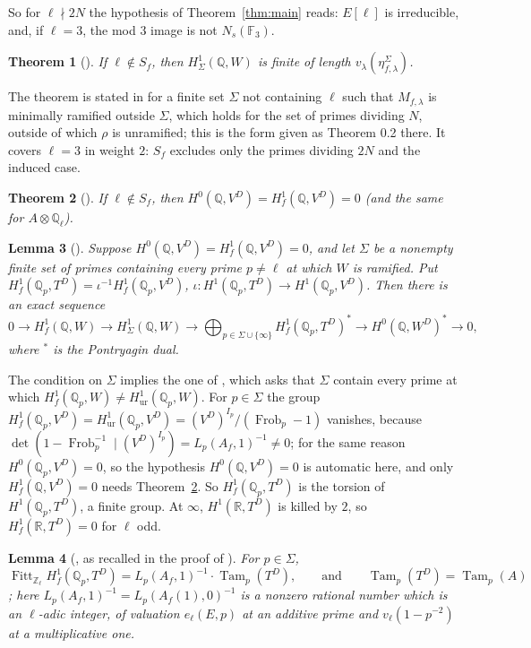 \documentclass[11pt]{amsart}
\newtheorem{theorem}{Theorem}[section]
\newtheorem{lemma}[theorem]{Lemma}
\theoremstyle{definition}
\newcommand{\Q}{\mathbb{Q}}
\newcommand{\Z}{\mathbb{Z}}
\newcommand{\F}{\mathbb{F}}
\newcommand{\R}{\mathbb{R}}
\newcommand{\Frob}{\operatorname{Frob}}
\newcommand{\Fitt}{\operatorname{Fitt}}
\newcommand{\Tam}{\operatorname{Tam}}
\begin{document}
So for $\ell\nmid2N$ the hypothesis of Theorem~\ref{thm:main} reads: $E[\ell]$ is irreducible, and, if $\ell=3$, the mod $3$ image is not $N_s(\F_3)$.

\begin{theorem}[{\cite[Theorem 3.7]{DFG04}}]\label{thm:dfg37}
If $\ell\notin S_f$, then $H^1_\Sigma(\Q,W)$ is finite of length $v_\lambda(\eta^\Sigma_{f,\lambda})$.
\end{theorem}
The theorem is stated in \cite{DFG04} for a finite set $\Sigma$ not containing $\ell$ such that $M_{f,\lambda}$ is minimally ramified outside $\Sigma$, which holds for the set of primes dividing $N$, outside of which $\rho$ is unramified; this is the form given as Theorem 0.2 there. It covers $\ell=3$ in weight $2$: $S_f$ excludes only the primes dividing $2N$ and the induced case.

\begin{theorem}[{\cite[Theorem 2.7]{DFG04}}]\label{thm:dfg27}
If $\ell\notin S_f$, then $H^0(\Q,V^D)=H^1_f(\Q,V^D)=0$ (and the same for $A\otimes\Q_\ell$).
\end{theorem}

\begin{lemma}[{\cite[Lemma 2.1]{DFG04}}]\label{lem:dfg21}
Suppose $H^0(\Q,V^D)=H^1_f(\Q,V^D)=0$, and let $\Sigma$ be a nonempty finite set of primes containing every prime $p\ne\ell$ at which $W$ is ramified. Put $H^1_f(\Q_p,T^D)=\iota^{-1}H^1_f(\Q_p,V^D)$, $\iota\colon H^1(\Q_p,T^D)\to H^1(\Q_p,V^D)$. Then there is an exact sequence
\[
0\to H^1_f(\Q,W)\to H^1_\Sigma(\Q,W)\to\bigoplus_{p\in\Sigma\cup\{\infty\}}H^1_f(\Q_p,T^D)^*\to H^0(\Q,W^D)^*\to0,
\]
where $^*$ is the Pontryagin dual.
\end{lemma}
The condition on $\Sigma$ implies the one of \cite{DFG04}, which asks that $\Sigma$ contain every prime at which $H^1_f(\Q_p,W)\ne H^1_{\mathrm{ur}}(\Q_p,W)$. For $p\in\Sigma$ the group $H^1_f(\Q_p,V^D)=H^1_{\mathrm{ur}}(\Q_p,V^D)=(V^D)^{I_p}/(\Frob_p-1)$ vanishes, because $\det(1-\Frob_p^{-1}\mid(V^D)^{I_p})=L_p(A_f,1)^{-1}\ne0$; for the same reason $H^0(\Q_p,V^D)=0$, so the hypothesis $H^0(\Q,V^D)=0$ is automatic here, and only $H^1_f(\Q,V^D)=0$ needs Theorem~\ref{thm:dfg27}. So $H^1_f(\Q_p,T^D)$ is the torsion of $H^1(\Q_p,T^D)$, a finite group. At $\infty$, $H^1(\R,T^D)$ is killed by $2$, so $H^1_f(\R,T^D)=0$ for $\ell$ odd.

\begin{lemma}[{\cite[I.4.2.2]{FPR94}, as recalled in the proof of \cite[Theorem 2.15]{DFG04}}]\label{lem:fpr}
For $p\in\Sigma$,
\[
\Fitt_{\Z_\ell}H^1_f(\Q_p,T^D)=L_p(A_f,1)^{-1}\cdot\Tam_p(T^D),\qquad\text{and}\qquad\Tam_p(T^D)=\Tam_p(A)
\]
\cite[(57)]{DFG04}; here $L_p(A_f,1)^{-1}=L_p(A_f(1),0)^{-1}$ is a nonzero rational number which is an $\ell$-adic integer, of valuation $e_\ell(E,p)$ at an additive prime and $v_\ell(1-p^{-2})$ at a multiplicative one.
\end{lemma}
\end{document}
